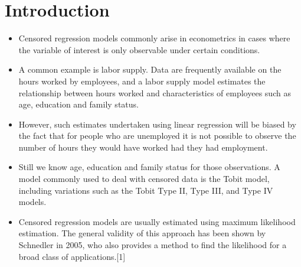 \documentclass[Master.tex]{subfiles}
\begin{document}
	
	\section{Introduction}


\begin{itemize}
\item	
	Censored regression models commonly arise in econometrics in cases where the variable of interest is only observable under certain conditions. 

\item A common example is labor supply. Data are frequently available on the hours worked by employees, and a labor supply model estimates the relationship between hours worked and characteristics of employees such as age, education and family status. 
\item However, such estimates undertaken using linear regression will be biased by the fact that for people who are unemployed it is not possible to observe the number of hours they would have worked had they had employment. 

\item Still we know age, education and family status for those observations.
A model commonly used to deal with censored data is the Tobit model, including variations such as the Tobit Type II, Type III, and Type IV models.

\item Censored regression models are usually estimated using maximum likelihood estimation. The general validity of this approach has been shown by Schnedler in 2005, who also provides a method to find the likelihood for a broad class of applications.[1]
\end{itemize}
\end{document}
